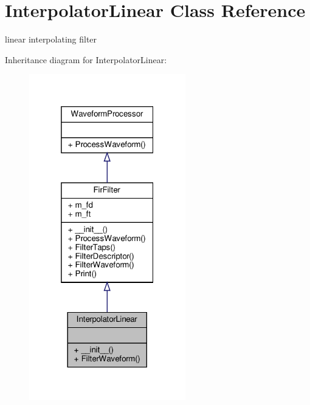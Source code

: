 \hypertarget{classSignalIntegrity_1_1TimeDomain_1_1Filters_1_1InterpolatorLinear_1_1InterpolatorLinear}{}\section{Interpolator\+Linear Class Reference}
\label{classSignalIntegrity_1_1TimeDomain_1_1Filters_1_1InterpolatorLinear_1_1InterpolatorLinear}


linear interpolating filter  




Inheritance diagram for Interpolator\+Linear\+:\nopagebreak
\begin{figure}[H]
\begin{center}
\leavevmode
\includegraphics[width=193pt]{classSignalIntegrity_1_1TimeDomain_1_1Filters_1_1InterpolatorLinear_1_1InterpolatorLinear__inherit__graph}
\end{center}
\end{figure}


